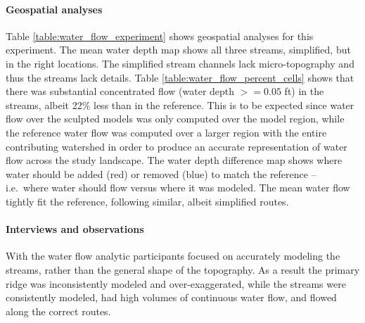 \documentclass[prodmode,acmtochi]{acmsmall} %
\begin{document}
\paragraph{Geospatial analyses}
Table \ref{table:water_flow_experiment} shows geospatial analyses for this experiment.
The mean water depth map shows all three streams, 
simplified, but in the right locations. 
The simplified stream channels lack micro-topography
and thus the streams lack details. 
Table \ref{table:water_flow_percent_cells} shows that 
there was substantial concentrated flow (water depth $>=0.05$ ft) 
in the streams, albeit 22\% less than in the reference.
This is to be expected 
since 
water flow over the sculpted models was only computed over the model region, 
while 
the reference water flow 
was computed over a larger region 
with the entire contributing watershed 
in order to produce an accurate representation 
of water flow across the study landscape. 
The water depth difference map shows
where water should be added (red) or removed (blue) 
to match the reference
-- i.e.~where water should flow versus where it was modeled. 
The mean water flow tightly fit the reference, 
following similar, albeit simplified routes.

\paragraph{Interviews and observations}
With the water flow analytic
participants focused on accurately modeling the streams, 
rather than the general shape of the topography. 
As a result the primary ridge was inconsistently modeled and over-exaggerated,
while the streams were consistently modeled,
had high volumes of continuous water flow, 
and flowed along the correct routes.
\end{document}

